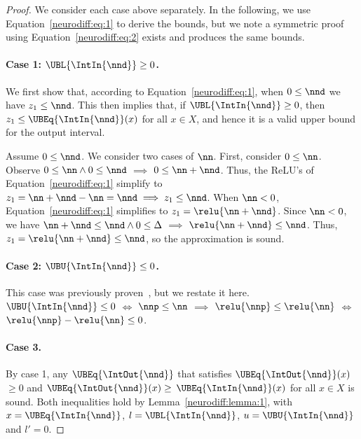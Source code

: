 \begin{proof}

We consider each case above separately. In the following, we use
Equation~\ref{neurodiff:eq:1} to derive the bounds, but we note a symmetric proof
using
Equation~\ref{neurodiff:eq:2} exists and produces the same bounds.

\paragraph{Case 1: $ \UBL{\IntIn{\nnd}} \geq 0 $.}
We first show that, according to Equation~\ref{neurodiff:eq:1}, when $ 0 \leq
\nnd $ we have $ z_1 \leq \nnd $. This then implies that, if
$ \UBL{\IntIn{\nnd}} \geq 0 $, then $ z_1 \leq \UBEq{\IntIn{\nnd}}(x)
$ for all $ x \in X $, and hence it is a valid upper bound for the output
interval.

Assume $ 0 \leq \nnd $. We consider two cases of $ \nn $. First, consider
$ 0 \leq \nn $. Observe $ 0 \leq \nn \wedge 0 \leq \nnd $ $ \implies $
$ 0 \leq \nn + \nnd $. Thus, the ReLU's of Equation~\ref{neurodiff:eq:1}
simplify to $ z_1 = \nn + \nnd - \nn = \nnd \implies z_1 \leq \nnd
$. When $ \nn < 0 $, Equation~\ref{neurodiff:eq:1} simplifies to $ z_1
= \relu{\nn + \nnd} $. Since $ \nn < 0 $, we have $ \nn
+ \nnd \leq \nnd \wedge 0 \leq \Delta $ $ \implies $ $ \relu{\nn + \nnd}
\leq \nnd$. Thus,
$ z_1 = \relu{\nn + \nnd} \leq \nnd $, so the approximation is
sound.

\paragraph{Case 2: $ \UBU{\IntIn{\nnd}} \leq 0 $.}
This case was previously proven~\cite{paulsen2020reludiff}, but we restate it
here.  $ \UBU{\IntIn{\nnd}} \leq 0 $ $ \iff $ $ \nnp \leq \nn $ $ \implies $
$\relu{\nnp} \leq \relu{\nn} $
$ \iff $ $ \relu{\nnp} - \relu{\nn} \leq 0 $.

\paragraph{Case 3.}
By case 1, any $ \UBEq{\IntOut{\nnd}} $ that satisfies
$ \UBEq{\IntOut{\nnd}}(x) $ $ \geq 0 $ and $ \UBEq{\IntOut{\nnd}}(x) \geq
$ $ \UBEq{\IntIn{\nnd}}(x) $ for all $ x \in X $ is sound. Both
inequalities hold by Lemma~\ref{neurodiff:lemma:1}, with $ x
= \UBEq{\IntIn{\nnd}} $, $l=\UBL{\IntIn{\nnd}}$,
$u=\UBU{\IntIn{\nnd}}$ and $ l' = 0 $.

\end{proof}


